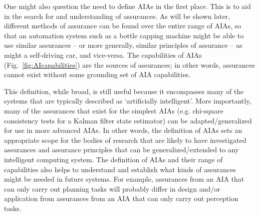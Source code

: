     One might also question the need to define AIAs in the first place. This is to aid in the search for and understanding of assurances. As will be shown later, different methods of assurance can be found over the entire range of AIAs, so that an automation system such as a bottle capping machine might be able to use similar assurances -- or more generally, similar principles of assurance -- as might a self-driving car, and vice-versa. The capabilities of AIAs (Fig.~\ref{fig:AIcapabilities}) are the sources of assurances; in other words, assurances cannot exist without some grounding set of AIA capabilities. 

This definition, while broad, is still useful because it encompasses many of the systems that are typically described as `artificially intelligent'. More importantly, many of the assurances that exist for the simplest AIAs (e.g. chi-square consistency tests for a Kalman filter state estimator) can be adapted/generalized for use in more advanced AIAs. 
In other words, the definition of AIAs sets an appropriate scope for the bodies of research that are likely to have investigated assurances and assurance principles that can be generalized/extended to any intelligent computing system. The definition of AIAs and their range of capabilities also helps to understand and establish what kinds of assurances might be needed in future systems. For example, assurances from an AIA that can only carry out planning tasks will probably differ in design and/or application from assurances from an AIA that can only carry out perception tasks. 
